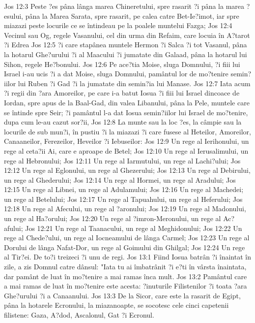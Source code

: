 Jos 12:3  Peste ?es pâna lânga marea Chineretului, spre rasarit ?i pâna la marea ?esului, pâna la Marea Sarata, spre rasarit, pe calea catre Bet-Ie?imot, iar spre miazazi peste locurile ce se întindeau pe la poalele muntelui Fazga;
Jos 12:4  Vecinul sau Og, regele Vasanului, cel din urma din Refaim, care locuia în A?tarot ?i Edrea
Jos 12:5  ?i care stapânea muntele Hermon ?i Salca ?i tot Vasanul, pâna la hotarul Ghe?urului ?i al Maacului ?i jumatate din Galaad, pâna la hotarul lui Sihon, regele He?bonului.
Jos 12:6  Pe ace?tia Moise, sluga Domnului, ?i fiii lui Israel i-au ucis ?i a dat Moise, sluga Domnului, pamântul lor de mo?tenire semin?iilor lui Ruben ?i Gad ?i la jumatate din semin?ia lui Manase.
Jos 12:7  Iata acum ?i regii din ?ara Amoreilor, pe care i-a batut Iosua ?i fiii lui Israel dincoace de Iordan, spre apus de la Baal-Gad, din valea Libanului, pâna la Pele, muntele care se întinde spre Seir; ?i pamântul l-a dat Iosua semin?iilor lui Israel de mo?tenire, dupa cum le-au cazut sor?ii,
Jos 12:8  La munte sau la loc ?es, la câmpie sau la locurile de sub mun?i, în pustiu ?i la miazazi ?i care fusese al Heteilor, Amoreilor, Canaaneilor, Ferezeilor, Heveilor ?i Iebuseilor:
Jos 12:9  Un rege al Ierihonului, un rege al ceta?ii Ai, care e aproape de Betel;
Jos 12:10  Un rege al Ierusalimului, un rege al Hebronului;
Jos 12:11  Un rege al Iarmutului, un rege al Lachi?ului;
Jos 12:12  Un rege al Eglonului, un rege al Ghezerului;
Jos 12:13  Un rege al Debirului, un rege al Ghederului;
Jos 12:14  Un rege al Hormei, un rege al Aradului;
Jos 12:15  Un rege al Libnei, un rege al Adulamului;
Jos 12:16  Un rege al Machedei; un rege al Betelului;
Jos 12:17  Un rege al Tapuahului, un rege al Heferului;
Jos 12:18  Un rege al Afecului, un rege al ?aronului;
Jos 12:19  Un rege al Madonului, un rege al Ha?orului;
Jos 12:20  Un rege al ?imron-Meronului, un rege al Ac?afului;
Jos 12:21  Un rege al Taanacului, un rege al Meghidonului;
Jos 12:22  Un rege al Chede?ului, un rege al Iocneamului de lânga Carmel;
Jos 12:23  Un rege al Dorului de lânga Nafat-Dor, un rege al Goimului din Ghilgal;
Jos 12:24  Un rege al Tir?ei. De to?i treizeci ?i unu de regi.
Jos 13:1  Fiind Iosua batrân ?i înaintat în zile, a zis Domnul catre dânsul: "Iata tu ai îmbatrânit ?i e?ti în vârsta înaintata, dar pamânt de luat în mo?tenire a mai ramas înca mult.
Jos 13:2  Pamântul care a mai ramas de luat în mo?tenire este acesta: ?inuturile Filistenilor ?i toata ?ara Ghe?urului ?i a Canaanului.
Jos 13:3  De la Sicor, care este la rasarit de Egipt, pâna la hotarele Ecronului, la miazanoapte, se socotesc cele cinci capetenii filistene: Gaza, A?dod, Ascalonul, Gat ?i Ecronul.
